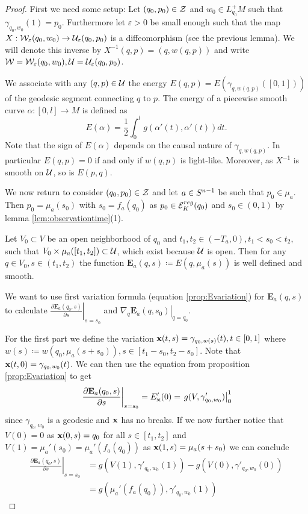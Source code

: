\begin{proof}
    First we need some setup: Let $(q_0,p_0)\in {\mathcal{Z}}$ and $w_0\in L^+_{q_0}M$ such that $\gamma_{q_0,w_0}(1) = p_0$. Furthermore let $\varepsilon>0$ be small enough such that the map $X:{\mathcal{W}}_\varepsilon(q_0,w_0)\to \mathcal{U}_\varepsilon(q_0,p_0)$ is a diffeomorphism (see the previous lemma). We will denote this inverse by $X^{-1}(q,p) = (q,w(q,p))$ and write ${\mathcal{W}}={\mathcal{W}}_\varepsilon(q_0,w_0), \mathcal{U}=\mathcal{U}_\varepsilon(q_0,p_0)$.
    
    We associate with any $(q,p)\in {\mathcal{U}}$ the energy $E(q,p)=E(\gamma_{q,w(q,p)}([0,1]))$ of the geodesic segment connecting $q$ to $p$. The energy of a piecewise smooth curve $\alpha:[0,l]\to M$ is defined as 
    \[
        E(\alpha) = \frac{1}{2}\int_0^l g(\alpha'(t),\alpha'(t))dt.
    \]
    Note that the sign of $E(\alpha)$ depends on the causal nature of $\gamma_{q,w(q,p)}$. In particular $E(q,p)=0$ if and only if $w(q,p)$ is light-like. Moreover, as $X^{-1}$ is smooth on $\mathcal{U}$, so is $E(p,q)$.
    
    We now return to consider $(q_0,p_0)\in {\mathcal{Z}}$ and let $a\in {S^{n-1}}$ be such that $p_0 \in \mu_a$. Then $p_0=\mu_a(s_0)$ with $s_0=f_a(q_0)$ as $p_0 \in {{\mathcal{E}}^{reg}_K}(q_0)$ and $s_0\in (0,1)$ by lemma \ref{lem:observationtime}(1). 
    
    Let $V_0\subset V$ be an open neighborhood of $q_0$ and $t_1,t_2\in (-T_a,0), t_1<s_0<t_2$, such that $V_0\times\mu_a([t_1,t_2])\subset \mathcal{U}$, which exist because $\mathcal{U}$ is open. Then for any $q\in V_0, s\in (t_1,t_2)$ the function $\mathbf{E}_a(q,s)\coloneqq E(q,\mu_a(s))$ is well defined and smooth.
    
    We want to use first variation formula (equation \ref{prop:Evariation}) for $\mathbf{E}_a(q,s)$ to calculate $\left.\frac{\partial\mathbf{E}_a(q_0,s)}{\partial s}\right\rvert_{s=s_0}$ and $\left.\nabla_q\mathbf{E}_a(q,s_0)\right\rvert_{q=q_0}$.
    
    For the first part we define the variation $\mathbf{x}(t,s) = \gamma_{q_0,w(s)}(t), t\in [0,1]$ where $w(s)\coloneqq  w(q_0,\mu_a(s+s_0)), s\in [t_1-s_0,t_2-s_0]$. Note that $\mathbf{x}(t,0)=\gamma_{q_0,w_0}(t)$. We can then use the equation from proposition \ref{prop:Evariation} to get
    \begin{align*}
        \left.\frac{\partial\mathbf{E}_a(q_0,s)}{\partial s}\right\rvert_{s=s_0} = E'_{\mathbf{x}}(0) =  \left.g(V,\gamma_{q_0,w_0}')\right\rvert^1_0
    \end{align*}
    since $\gamma_{q_0,w_0}$ is a geodesic and $\mathbf{x}$ has no breaks. If we now further notice that $V(0)=0$ as $\mathbf{x}(0,s)=q_0$ for all $s\in[t_1,t_2]$ and $V(1) = \mu_a'(s_0) = \mu_a'(f_a(q_0))$ as $\mathbf{x}(1,s) = \mu_a(s+s_0)$ we can conclude 
    \begin{align*}
        \left.\frac{\partial\mathbf{E}_a(q_0,s)}{\partial s}\right\rvert_{s=s_0} &= g(V(1),\gamma'_{q_0,w_0}(1)) - g(V(0),\gamma'_{q_0,w_0}(0))\\
        &= g(\mu_a'(f_a(q_0)),\gamma'_{q_0,w_0}(1))
    \end{align*}
    

\end{proof}
